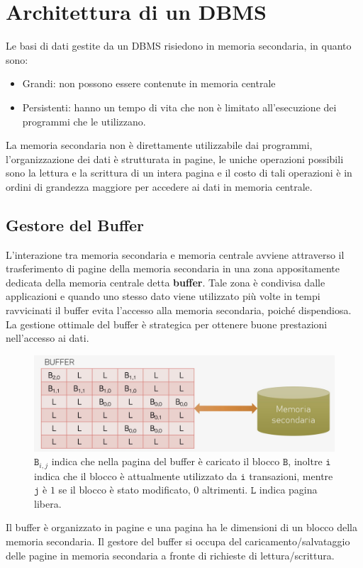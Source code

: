 \documentclass[oneside,a4paper,11pt]{book}
\theoremstyle{italicstyle}
\theoremstyle{normStyle}
\begin{document}
\section{Architettura di un DBMS}
Le basi di dati gestite da un DBMS risiedono in memoria secondaria, in 
quanto sono:
\begin{itemize}
    \item Grandi: non possono essere contenute in memoria centrale
    \item Persistenti: hanno un tempo di vita che non è limitato all'esecuzione 
    dei programmi che le utilizzano.
\end{itemize}
La memoria secondaria non è direttamente utilizzabile dai programmi, 
l'organizzazione dei dati è strutturata in pagine, le uniche operazioni 
possibili sono la lettura e la scrittura di un intera pagina e il costo 
di tali operazioni è in ordini di grandezza maggiore per accedere ai 
dati in memoria centrale.
\subsection{Gestore del Buffer}
L'interazione tra memoria secondaria e memoria centrale avviene attraverso 
il trasferimento di pagine della memoria secondaria in una zona appositamente 
dedicata della memoria centrale detta \textbf{buffer}. Tale zona è 
condivisa dalle applicazioni e quando uno stesso dato viene utilizzato 
più volte in tempi ravvicinati il buffer evita l'accesso alla memoria secondaria,
poiché dispendiosa. La gestione ottimale del buffer è strategica per ottenere 
buone prestazioni nell'accesso ai dati.
\begin{figure}[H]
    \centering
    \includegraphics[width=15cm]{img/buffer.jpeg}
    \caption{$\texttt{B}_{i,j}$ indica che nella pagina del buffer è caricato 
    il blocco $\texttt{B}$, inoltre $\texttt{i}$ indica che il blocco è attualmente 
    utilizzato da $\texttt{i}$ transazioni, mentre $\texttt{j}$ è $1$ se il blocco è stato modificato,
    $0$ altrimenti. $\texttt{L}$ indica pagina libera.}
    \label{fig:buffer}
  \end{figure}
Il buffer è organizzato in pagine e una pagina ha le dimensioni di un blocco della memoria
secondaria. Il gestore del buffer si occupa del caricamento/salvataggio delle pagine in 
memoria secondaria a fronte di richieste di lettura/scrittura.
\end{document}
